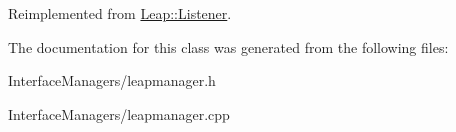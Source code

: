 Reimplemented from \hyperlink{class_leap_1_1_listener_ab600421108bbc952d8f0f144384ca30f}{Leap\+::\+Listener}.



The documentation for this class was generated from the following files\+:\begin{DoxyCompactItemize}
\item 
Interface\+Managers/leapmanager.\+h\item 
Interface\+Managers/leapmanager.\+cpp\end{DoxyCompactItemize}
